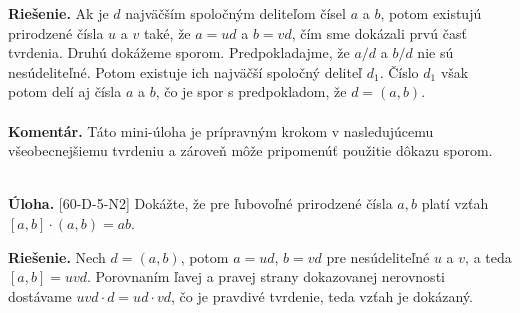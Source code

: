\documentclass[11pt,a4paper,oneside,final]{book}
\newcommand{\kom}{\textbf{Komentár.} }
\newcommand{\ul}{\textbf{Úloha.} }
\newcommand{\rie}{\textbf{Riešenie.} }
\begin{document}
\rie Ak je $d$ najväčším spoločným deliteľom čísel $a$ a $b$, potom existujú prirodzené čísla $u$ a $v$ také, že $a=ud$ a $b=vd$, čím sme dokázali prvú časť tvrdenia. Druhú dokážeme sporom. Predpokladajme, že $a/d$ a $b/d$ nie sú nesúdeliteľné. Potom existuje ich najväčší spoločný deliteľ $d_1$. Číslo $d_1$ však potom delí aj čísla $a$ a $b$, čo je spor s predpokladom, že $d=(a,b)$.\\
\\
\kom Táto mini-úloha je prípravným krokom v nasledujúcemu všeobecnejšiemu tvrdeniu a zároveň môže pripomenúť použitie dôkazu sporom.\\
\\
\begin{tcolorbox}[breakable,notitle,boxrule=0pt,colback=light-gray,colframe=light-gray]\ul [60-D-5-N2] Dokážte, že pre ľubovoľné prirodzené čísla $a, b$ platí vzťah $[a, b] \cdot (a, b) = ab$.

\end{tcolorbox}

\rie Nech $d = (a, b)$, potom $a = ud$, $b = vd$ pre nesúdeliteľné $u$ a $v$, a teda $[a, b] = uvd$. Porovnaním ľavej a pravej strany dokazovanej nerovnosti dostávame $uvd\cdot d = ud\cdot vd$, čo je pravdivé tvrdenie, teda vzťah je dokázaný.
\end{document}
